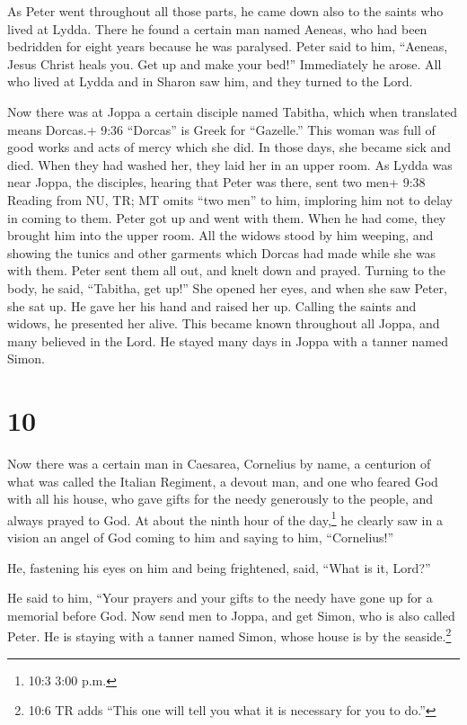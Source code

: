  As Peter went throughout all those parts, he came down
also to the saints who lived at Lydda.  There he found a
certain man named Aeneas, who had been bedridden for eight years because
he was paralysed.  Peter said to him, ``Aeneas, Jesus
Christ heals you. Get up and make your bed!'' Immediately he arose.
 All who lived at Lydda and in Sharon saw him, and they
turned to the Lord.

 Now there was at Joppa a certain disciple named Tabitha,
which when translated means Dorcas.+ 9:36 ``Dorcas'' is Greek for
``Gazelle.'' This woman was full of good works and acts of mercy which
she did.  In those days, she became sick and died. When
they had washed her, they laid her in an upper room.  As
Lydda was near Joppa, the disciples, hearing that Peter was there, sent
two men+ 9:38 Reading from NU, TR; MT omits ``two men'' to him,
imploring him not to delay in coming to them.  Peter got up
and went with them. When he had come, they brought him into the upper
room. All the widows stood by him weeping, and showing the tunics and
other garments which Dorcas had made while she was with them.
 Peter sent them all out, and knelt down and prayed.
Turning to the body, he said, ``Tabitha, get up!'' She opened her eyes,
and when she saw Peter, she sat up.  He gave her his hand
and raised her up. Calling the saints and widows, he presented her
alive.  This became known throughout all Joppa, and many
believed in the Lord.  He stayed many days in Joppa with a
tanner named Simon.

\hypertarget{section-9}{%
\section{10}\label{section-9}}

 Now there was a certain man in Caesarea, Cornelius by name,
a centurion of what was called the Italian Regiment,  a
devout man, and one who feared God with all his house, who gave gifts
for the needy generously to the people, and always prayed to God.
 At about the ninth hour of the day,\footnote{10:3 3:00 p.m.}
he clearly saw in a vision an angel of God coming to him and saying to
him, ``Cornelius!''

 He, fastening his eyes on him and being frightened, said,
``What is it, Lord?''

He said to him, ``Your prayers and your gifts to the needy have gone up
for a memorial before God.  Now send men to Joppa, and get
Simon, who is also called Peter.  He is staying with a
tanner named Simon, whose house is by the seaside.\footnote{10:6 TR adds
  ``This one will tell you what it is necessary for you to do.''}

